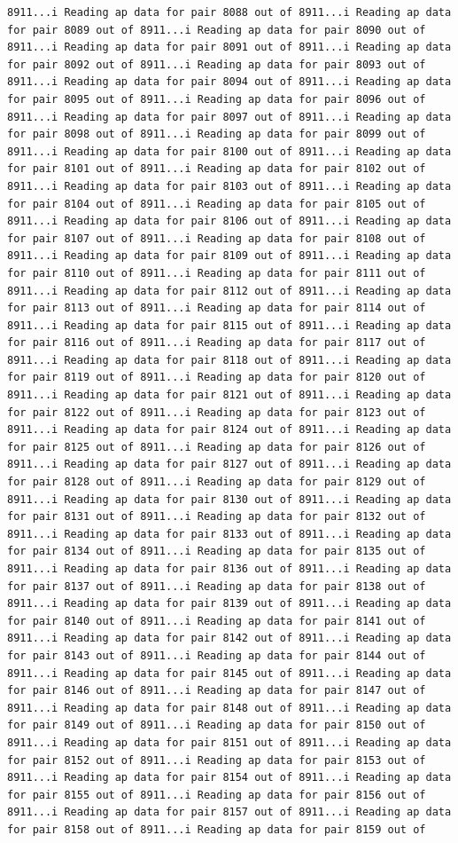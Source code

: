 \documentclass[
]{article}
\begin{document}
\begin{verbatim}
8911...i Reading ap data for pair 8088 out of 8911...i Reading ap data for pair 8089 out of 8911...i Reading ap data for pair 8090 out of 8911...i Reading ap data for pair 8091 out of 8911...i Reading ap data for pair 8092 out of 8911...i Reading ap data for pair 8093 out of 8911...i Reading ap data for pair 8094 out of 8911...i Reading ap data for pair 8095 out of 8911...i Reading ap data for pair 8096 out of 8911...i Reading ap data for pair 8097 out of 8911...i Reading ap data for pair 8098 out of 8911...i Reading ap data for pair 8099 out of 8911...i Reading ap data for pair 8100 out of 8911...i Reading ap data for pair 8101 out of 8911...i Reading ap data for pair 8102 out of 8911...i Reading ap data for pair 8103 out of 8911...i Reading ap data for pair 8104 out of 8911...i Reading ap data for pair 8105 out of 8911...i Reading ap data for pair 8106 out of 8911...i Reading ap data for pair 8107 out of 8911...i Reading ap data for pair 8108 out of 8911...i Reading ap data for pair 8109 out of 8911...i Reading ap data for pair 8110 out of 8911...i Reading ap data for pair 8111 out of 8911...i Reading ap data for pair 8112 out of 8911...i Reading ap data for pair 8113 out of 8911...i Reading ap data for pair 8114 out of 8911...i Reading ap data for pair 8115 out of 8911...i Reading ap data for pair 8116 out of 8911...i Reading ap data for pair 8117 out of 8911...i Reading ap data for pair 8118 out of 8911...i Reading ap data for pair 8119 out of 8911...i Reading ap data for pair 8120 out of 8911...i Reading ap data for pair 8121 out of 8911...i Reading ap data for pair 8122 out of 8911...i Reading ap data for pair 8123 out of 8911...i Reading ap data for pair 8124 out of 8911...i Reading ap data for pair 8125 out of 8911...i Reading ap data for pair 8126 out of 8911...i Reading ap data for pair 8127 out of 8911...i Reading ap data for pair 8128 out of 8911...i Reading ap data for pair 8129 out of 8911...i Reading ap data for pair 8130 out of 8911...i Reading ap data for pair 8131 out of 8911...i Reading ap data for pair 8132 out of 8911...i Reading ap data for pair 8133 out of 8911...i Reading ap data for pair 8134 out of 8911...i Reading ap data for pair 8135 out of 8911...i Reading ap data for pair 8136 out of 8911...i Reading ap data for pair 8137 out of 8911...i Reading ap data for pair 8138 out of 8911...i Reading ap data for pair 8139 out of 8911...i Reading ap data for pair 8140 out of 8911...i Reading ap data for pair 8141 out of 8911...i Reading ap data for pair 8142 out of 8911...i Reading ap data for pair 8143 out of 8911...i Reading ap data for pair 8144 out of 8911...i Reading ap data for pair 8145 out of 8911...i Reading ap data for pair 8146 out of 8911...i Reading ap data for pair 8147 out of 8911...i Reading ap data for pair 8148 out of 8911...i Reading ap data for pair 8149 out of 8911...i Reading ap data for pair 8150 out of 8911...i Reading ap data for pair 8151 out of 8911...i Reading ap data for pair 8152 out of 8911...i Reading ap data for pair 8153 out of 8911...i Reading ap data for pair 8154 out of 8911...i Reading ap data for pair 8155 out of 8911...i Reading ap data for pair 8156 out of 8911...i Reading ap data for pair 8157 out of 8911...i Reading ap data for pair 8158 out of 8911...i Reading ap data for pair 8159 out of 
\end{verbatim}
\end{document}
